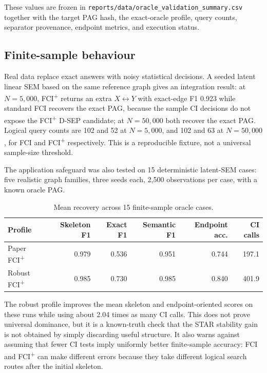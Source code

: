 \documentclass[11pt,a4paper]{article}
\newcommand{\FCIplus}{FCI\textsuperscript{+}}
\newcommand{\code}[1]{\texttt{#1}}
\begin{document}
These values are frozen in \code{reports/data/oracle\_validation\_summary.csv}
together with the target PAG hash, the exact-oracle profile, query counts,
separator provenance, endpoint metrics, and execution status.

\subsection{Finite-sample behaviour}

Real data replace exact answers with noisy statistical decisions. A seeded
latent linear SEM based on the same reference graph gives an integration
result: at \(N = 5{,}000\), \FCIplus{} returns an extra \(X \leftrightarrow Y\)
with exact-edge F1 0.923 while standard FCI recovers the exact PAG, because the
sample CI decisions do not expose the \FCIplus{} D-SEP candidate; at
\(N = 50{,}000\) both recover the exact PAG. Logical query counts are 102 and
52 at \(N = 5{,}000\), and 102 and 63 at \(N = 50{,}000\), for FCI and
\FCIplus{} respectively. This is a reproducible fixture, not a universal
sample-size threshold.

The application safeguard was also tested on 15 deterministic latent-SEM cases:
five realistic graph families, three seeds each, 2,500 observations per case,
with a known oracle PAG.

\begin{table}[H]
\caption{Mean recovery across 15 finite-sample oracle cases.}
\label{tab:robust-finite-sample}
\centering
\begin{tabular}{lrrrrr}
\toprule
Profile & Skeleton F1 & Exact F1 & Semantic F1 & Endpoint acc. & CI calls \\
\midrule
Paper \FCIplus{} & 0.979 & 0.536 & 0.951 & 0.744 & 197.1 \\
Robust \FCIplus{} & 0.985 & 0.730 & 0.985 & 0.840 & 401.9 \\
\bottomrule
\end{tabular}
\end{table}

The robust profile improves the mean skeleton and endpoint-oriented scores on
these runs while using about 2.04 times as many CI calls. This does not prove
universal dominance, but it is a known-truth check that the STAR stability gain
is not obtained by simply discarding useful structure. It also warns against
assuming that fewer CI tests imply uniformly better finite-sample accuracy: FCI
and \FCIplus{} can make different errors because they take different logical
search routes after the initial skeleton.
\end{document}
